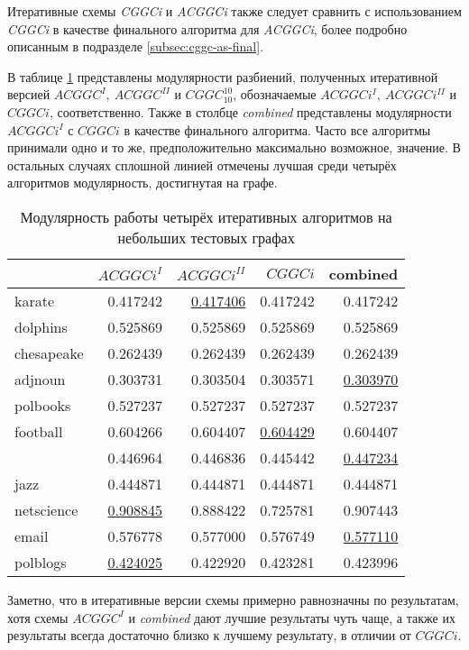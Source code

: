 Итеративные схемы \emph{CGGCi} и \emph{ACGGCi} также следует сравнить с использованием \emph{CGGCi} в качестве финального алгоритма для \emph{ACGGCi}, более подробно описанным в подразделе \ref{subsec:cggc-as-final}.

В таблице \ref{tab:esi-res-q} представлены модулярности разбиений, полученных итеративной версией $ACGGC^{I},\ ACGGC^{II}$ и $CGGC_{10}^{10}$, обозначаемые $ACGGCi^{I},\ ACGGCi^{II}$ и $CGGCi$, соответственно. Также в столбце \emph{combined} представлены модулярности $ACGGCi^{I}$ с $CGGCi$ в качестве финального алгоритма. Часто все алгоритмы принимали одно и то же, предположительно максимально возможное, значение. В остальных случаях сплошной линией отмечены лучшая среди четырёх алгоритмов модулярность, достигнутая на графе.

\begin{table}[H]
	\caption{Модулярность работы четырёх итеративных алгоритмов на небольших тестовых графах}
	\label{tab:esi-res-q}
	\begin{tabularx}{\textwidth}{Xrrrr} \hline
					& $ACGGCi^{I}$ & $ACGGCi^{II}$ & $CGGCi$	& combined \\ \hline
	karate			& 0.417242	& \uline{0.417406}	& 0.417242	& 0.417242	\\
	dolphins		& 0.525869	& 0.525869	& 0.525869	& 0.525869	\\
	chesapeake		& 0.262439	& 0.262439	& 0.262439	& 0.262439	\\
	adjnoun			& 0.303731	& 0.303504	& 0.303571	& \uline{0.303970}	\\
	polbooks		& 0.527237	& 0.527237	& 0.527237	& 0.527237	\\
	football		& 0.604266	& 0.604407	& \uline{0.604429}	& 0.604407	\\
	\celegans 		& 0.446964	& 0.446836	& 0.445442	& \uline{0.447234}	\\
	jazz			& 0.444871	& 0.444871	& 0.444871	& 0.444871	\\
	netscience		& \uline{0.908845}	& 0.888422	& 0.725781	& 0.907443	\\
	email			& 0.576778	& 0.577000	& 0.576749	& \uline{0.577110}	\\
	polblogs		& \uline{0.424025}	& 0.422920	& 0.423281	& 0.423996	\\
	\hline
	\end{tabularx}
\end{table}

Заметно, что в итеративные версии схемы примерно равнозначны по результатам, хотя схемы $ACGGC^{I}$ и \emph{combined} дают лучшие результаты чуть чаще, а также их результаты всегда достаточно близко к лучшему результату, в отличии от $CGGCi$.